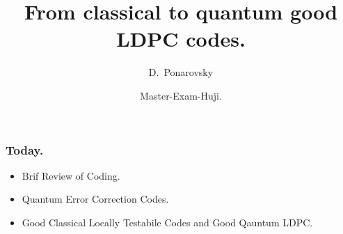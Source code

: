 \documentclass[usenames, aspectratio=169]{beamer}
\title[From classical to quantum good LDPC codes.] %
{From classical to quantum good LDPC codes.}
\subtitle{  }
\author[D.~Ponarovsky] %
	{D.~Ponarovsky\inst{1}}
\institute[HUJI] %
{  Faculty of Computer Science\newline
  Hebrew University of Jerusalem
}
\date[2023] %
{Master-Exam-Huji.}
\newcommand{\pslsq}[4]{
\begin{frame}
    \frametitle{#1} 
    \texttt{[image: \#3]}
    #4  
  \end{frame}
}
\begin{document}



\begin{frame}
  \maketitle
\end{frame}

\begin{frame}
  \frametitle{ Today. }
  \begin{itemize}
    \item<1-> Brif Review of Coding. 
    \item<3-> Quantum Error Correction Codes. 
    \item<4->Good Classical Locally Testabile Codes and Good Qauntum LDPC.
  \end{itemize} 
\end{frame}
\end{document}
